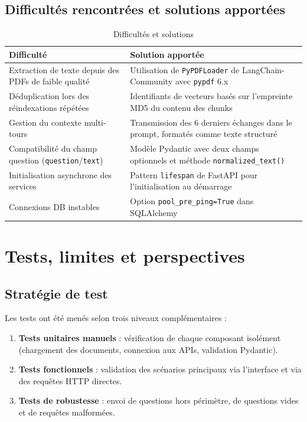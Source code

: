 \documentclass[12pt, a4paper, twoside]{report}
\begin{document}
\section{Difficultés rencontrées et solutions apportées}

\begin{table}[H]
\centering
\caption{Difficultés et solutions}
\label{tab:difficultes}
\begin{tabularx}{\textwidth}{X X}
\toprule
\rowcolor{primary!10}
\textbf{Difficulté} & \textbf{Solution apportée} \\
\midrule
Extraction de texte depuis des PDFs de faible qualité & Utilisation de \texttt{PyPDFLoader} de LangChain-Community avec \texttt{pypdf} 6.x \\
Déduplication lors des réindexations répétées & Identifiants de vecteurs basés sur l'empreinte MD5 du contenu des chunks \\
Gestion du contexte multi-tours & Transmission des 6 derniers échanges dans le prompt, formatés comme texte structuré \\
Compatibilité du champ question (\texttt{question}/\texttt{text}) & Modèle Pydantic avec deux champs optionnels et méthode \texttt{normalized\_text()} \\
Initialisation asynchrone des services & Pattern \texttt{lifespan} de FastAPI pour l'initialisation au démarrage \\
Connexions DB instables & Option \texttt{pool\_pre\_ping=True} dans SQLAlchemy \\
\bottomrule
\end{tabularx}
\end{table}

\cleardoublepage

\chapter{Tests, limites et perspectives}

\section{Stratégie de test}

Les tests ont été menés selon trois niveaux complémentaires :

\begin{enumerate}
  \item \textbf{Tests unitaires manuels} : vérification de chaque composant isolément (chargement des documents, connexion aux APIs, validation Pydantic).
  \item \textbf{Tests fonctionnels} : validation des scénarios principaux via l'interface et via des requêtes HTTP directes.
  \item \textbf{Tests de robustesse} : envoi de questions hors périmètre, de questions vides et de requêtes malformées.
\end{enumerate}
\end{document}
